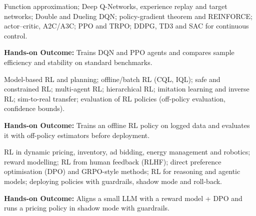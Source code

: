 \documentclass[10pt,a4paper]{article}
\begin{document}
\begin{tcolorbox}[unitbox,title={{\color{gold}UNIT III}\quad Deep Reinforcement Learning\hfill{\color{gold}9 Hours}}]\small Function approximation; Deep Q-Networks, experience replay and target networks; Double and Dueling DQN; policy-gradient theorem and REINFORCE; actor–critic, A2C/A3C; PPO and TRPO; DDPG, TD3 and SAC for continuous control.\par\vspace{2pt}\par\textbf{Hands-on Outcome:} Trains DQN and PPO agents and compares sample eﬀiciency and stability on standard benchmarks.\end{tcolorbox}
\begin{tcolorbox}[unitbox,title={{\color{gold}UNIT IV}\quad Advanced and Offline RL\hfill{\color{gold}9 Hours}}]\small Model-based RL and planning; offline/batch RL (CQL, IQL); safe and constrained RL; multi-agent RL; hierarchical RL; imitation learning and inverse RL; sim-to-real transfer; evaluation of RL policies (off-policy evaluation, confidence bounds).\par\vspace{2pt}\par\textbf{Hands-on Outcome:} Trains an offline RL policy on logged data and evaluates it with off-policy estimators before deployment.\end{tcolorbox}
\begin{tcolorbox}[unitbox,title={{\color{gold}UNIT V}\quad RL for Enterprise and LLM Alignment\hfill{\color{gold}9 Hours}}]\small RL in dynamic pricing, inventory, ad bidding, energy management and robotics; reward modelling; RL from human feedback (RLHF); direct preference optimisation (DPO) and GRPO-style methods; RL for reasoning and agentic models; deploying policies with guardrails, shadow mode and roll-back.\par\vspace{2pt}\par\textbf{Hands-on Outcome:} Aligns a small LLM with a reward model + DPO and runs a pricing policy in shadow mode with guardrails.\end{tcolorbox}
\end{document}
